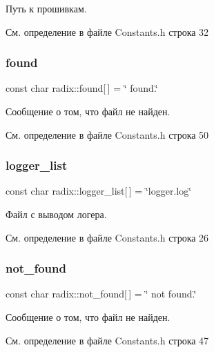 Путь к прошивкам. 

См. определение в файле Constants.\+h строка 32

\mbox{\label{namespaceradix_a27726ea7eb8e2bea153425bce9328be5}} 
\subsubsection{\texorpdfstring{found}{found}}
{\footnotesize\ttfamily const char radix\+::found\mbox{[}$\,$\mbox{]} = \char`\"{} found.\char`\"{}}

Сообщение о том, что файл не найден. 

См. определение в файле Constants.\+h строка 50

\mbox{\label{namespaceradix_a11c5bfe5c65a0f88a2a950111c6ffc09}} 
\subsubsection{\texorpdfstring{logger\+\_\+list}{logger\_list}}
{\footnotesize\ttfamily const char radix\+::logger\+\_\+list\mbox{[}$\,$\mbox{]} = \char`\"{}logger.\+log\char`\"{}}

Файл с выводом логера. 

См. определение в файле Constants.\+h строка 26

\mbox{\label{namespaceradix_a9f0187ab8d7f9931ed08159a233408c0}} 
\subsubsection{\texorpdfstring{not\+\_\+found}{not\_found}}
{\footnotesize\ttfamily const char radix\+::not\+\_\+found\mbox{[}$\,$\mbox{]} = \char`\"{} not found.\char`\"{}}

Сообщение о том, что файл не найден. 

См. определение в файле Constants.\+h строка 47

\mbox{\label{namespaceradix_aa90f63f1d0143b58469670ccbb86cfc4}} 

